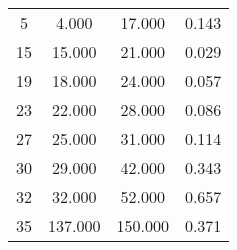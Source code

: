 % 
\begin{tabular}{cccc}
  \hline
  \hline
5 & 4.000 & 17.000 & 0.143 \\ 
  15 & 15.000 & 21.000 & 0.029 \\ 
  19 & 18.000 & 24.000 & 0.057 \\ 
  23 & 22.000 & 28.000 & 0.086 \\ 
  27 & 25.000 & 31.000 & 0.114 \\ 
  30 & 29.000 & 42.000 & 0.343 \\ 
  32 & 32.000 & 52.000 & 0.657 \\ 
  35 & 137.000 & 150.000 & 0.371 \\ 
   \hline
\end{tabular}
